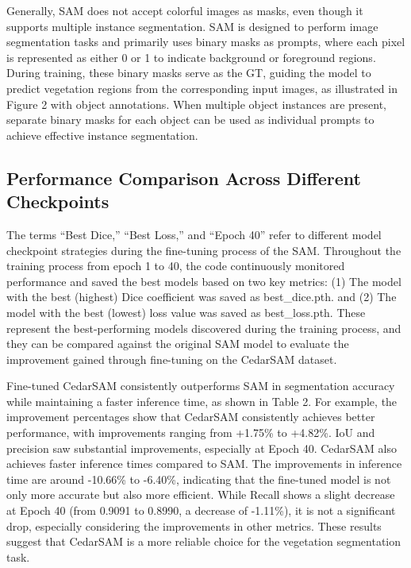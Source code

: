 \documentclass[letterpaper, 10 pt, conference]{ieeeconf}  %
\begin{document}
Generally, SAM does not accept colorful images as masks, even though it supports multiple instance segmentation. SAM is designed to perform image segmentation tasks and primarily uses binary masks as prompts, where each pixel is represented as either 0 or 1 to indicate background or foreground regions. During training, these binary masks serve as the GT, guiding the model to predict vegetation regions from the corresponding input images, as illustrated in Figure 2 with object annotations. When multiple object instances are present, separate binary masks for each object can be used as individual prompts to achieve effective instance segmentation.

\subsection{Performance Comparison Across Different Checkpoints}

The terms ``Best Dice,'' ``Best Loss,'' and ``Epoch 40'' refer to different model checkpoint strategies during the fine-tuning process of the SAM. Throughout the training process from epoch 1 to 40, the code continuously monitored performance and saved the best models based on two key metrics: (1) The model with the best (highest) Dice coefficient was saved as best\_dice.pth. and (2) The model with the best (lowest) loss value was saved as best\_loss.pth. These represent the best-performing models discovered during the training process, and they can be compared against the original SAM model to evaluate the improvement gained through fine-tuning on the CedarSAM dataset.

Fine-tuned CedarSAM consistently outperforms SAM in segmentation accuracy while maintaining a faster inference time, as shown in Table 2. For example, the improvement percentages show that CedarSAM consistently achieves better performance, with improvements ranging from +1.75\% to +4.82\%. IoU and precision saw substantial improvements, especially at Epoch 40. CedarSAM also achieves faster inference times compared to SAM. The improvements in inference time are around -10.66\% to -6.40\%, indicating that the fine-tuned model is not only more accurate but also more efficient. While Recall shows a slight decrease at Epoch 40 (from 0.9091 to 0.8990, a decrease of -1.11\%), it is not a significant drop, especially considering the improvements in other metrics. These results suggest that CedarSAM is a more reliable choice for the vegetation segmentation task.
\end{document}
